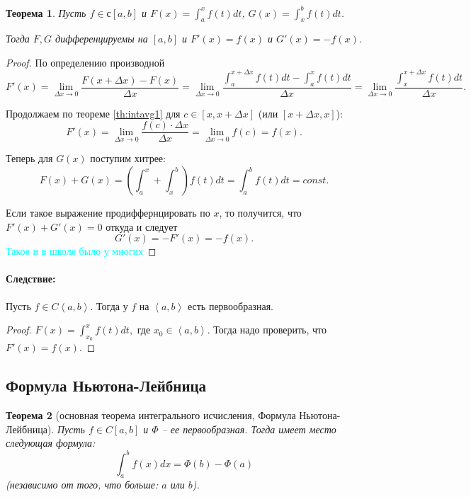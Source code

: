 \documentclass{article}
\theoremstyle{plain}
\newtheorem{theorem}{Теорема}
\theoremstyle{definition}
\theoremstyle{remark}
\renewcommand{\*}{\cdot}
\begin{document}
\begin{theorem}
Пусть $f\in \mathbb{с}[a, b]$ и $\displaystyle F(x) = \int_a^x f(t)dt$, $\displaystyle G(x) =\int_x^b f(t)dt$.

Тогда $F, G$ дифференцируемы на $[a,b]$ и $F'(x) = f(x)$ и $G'(x) = -f(x)$.
\end{theorem}


\begin{proof}
По определению производной $$F'(x) = \lim_{\Delta x \to 0} \frac{F(x+\Delta x) - F(x)}{\Delta x} = \lim_{\Delta x \to 0} \frac{\int_a^{x+\Delta x}f(t)dt - \int_a^{x}f(t)dt}{\Delta x} = \lim_{\Delta x \to 0} \frac{\int_x^{x+\Delta x}f(t)dt}{\Delta x}.$$

Продолжаем по теореме \ref{th:intavg1} для $c\in [x, x+\Delta x]$ (или $[x+\Delta x, x]$):
$$F'(x)= \lim_{\Delta x \to 0} \frac{f(c)\cdot \Delta x}{\Delta x} = \lim_{\Delta x \to 0}f(c) = f(x).$$

Теперь для $G(x)$ поступим хитрее:
$$F(x) + G(x) = \left(\int_a^x + \int _x^b\right)f(t)dt = \int_a^b f(t)dt = const.$$

Если такое выражение продиффернцировать по $x$, то получится, что $F'(x) + G'(x) = 0$ откуда и следует $$G'(x) = -F'(x) = -f(x).$$
\textcolor{cyan}{Такое и в школе было у многих}
\end{proof}



\paragraph{Следствие:} Пусть $f\in C\left<a, b\right>$. Тогда у $f$ на $\left<a, b\right>$ есть первообразная. 

\begin{proof}
$F(x) = \int_{x_0}^x f(t)dt,$ где $x_0\in \left<a, b\right>$. Тогда надо проверить, что $F'(x) = f(x)$.
\end{proof}

\subsection{Формула Ньютона-Лейбница}
\begin{theorem}[основная теорема интегрального исчисления, Формула Ньютона-Лейбница]\label{th:nlformula} Пусть $f\in C[a,b]$ и $\Phi$ -- ее первообразная.
Тогда имеет место следующая формула: $$\int_a^b f(x)dx = \Phi(b) - \Phi(a)$$ (независимо от того, что больше: $a$ или $b$).
\end{theorem}
\end{document}
